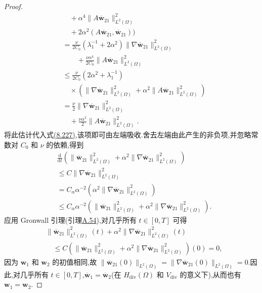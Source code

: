 \begin{theorem}[周期边界情形下解的存在唯一性]
\begin{proof}
\[\begin{aligned}
   &\quad+\alpha^4\|A\overline{\bm{w}}_{21}\|_{L^2(\Omega)}^2\\
   &\quad+2\alpha^2(A\overline{\bm{w}}_{21},
                 \overline{\bm{w}}_{21})\Bigr)\\
 &=\frac{\nu}{2C_0}(\lambda_1^{-1}+2\alpha^2)
       \|\nabla\overline{\bm{w}}_{21}\|_{L^2(\Omega)}^2\\
 &\qquad
   +\frac{\nu\alpha^4}{2C_0}
       \|A\overline{\bm{w}}_{21}\|_{L^2(\Omega)}^2\\
 &\le\frac{\nu}{2C_0}(2\alpha^2+\lambda_1^{-1})\\
 &\quad\times\left(
   \|\nabla\overline{\bm{w}}_{21}\|_{L^2(\Omega)}^2
   +\alpha^2\|A\overline{\bm{w}}_{21}\|_{L^2(\Omega)}^2\right)\\
 &=\frac{\nu}{2}
    \|\nabla\overline{\bm{w}}_{21}\|_{L^2(\Omega)}^2\\
  &\quad+\frac{\nu\alpha^2}{2}
    \|A\overline{\bm{w}}_{21}\|_{L^2(\Omega)}^2.
\end{aligned}
\]
将此估计代入式\hyperref[eq:navier-stokes-alpha-uniqueness-energy-bound]{(8.227)},该项即可由左端吸收.舍去左端由此产生的非负项,并忽略常数对 $C_0$ 和 $\nu$ 的依赖,得到
\[
\begin{aligned}
 &\frac{\mathrm{d}}{\mathrm{d}t}
  \left(\|\overline{\bm{w}}_{21}\|_{L^2(\Omega)}^2
       +\alpha^2\|\nabla\overline{\bm{w}}_{21}\|_{L^2(\Omega)}^2\right)\\
 &\le C\|\nabla\overline{\bm{w}}_{21}\|_{L^2(\Omega)}^2\\
 &=C_\alpha\alpha^{-2}\left(
       \alpha^2\|\nabla\overline{\bm{w}}_{21}\|_{L^2(\Omega)}^2\right)\\
 &\le C_\alpha\alpha^{-2}
  \left(\|\overline{\bm{w}}_{21}\|_{L^2(\Omega)}^2
       +\alpha^2\|\nabla\overline{\bm{w}}_{21}\|_{L^2(\Omega)}^2\right).
\end{aligned}
\]
应用 Gronwall 引理(引理\hyperref[lem:appendix-a-54]{A.54}),对几乎所有 $t\in[0,T]$ 可得
\[
\begin{aligned}
 &\|\overline{\bm{w}}_{21}\|_{L^2(\Omega)}^2(t)
  +\alpha^2\|\nabla\overline{\bm{w}}_{21}\|_{L^2(\Omega)}^2(t)\\
 &\quad\le C\left(
  \|\overline{\bm{w}}_{21}\|_{L^2(\Omega)}^2
  +\alpha^2\|\nabla\overline{\bm{w}}_{21}\|_{L^2(\Omega)}^2\right)(0)=0,
\end{aligned}
\]
因为 $\bm{w}_1$ 和 $\bm{w}_2$ 的初值相同,故
$\|\overline{\bm{w}}_{21}(0)\|_{L^2(\Omega)}
=\|\nabla\overline{\bm{w}}_{21}(0)\|_{L^2(\Omega)}=0$.因此,对几乎所有 $t\in[0,T]$,$\overline{\bm{w}}_1=\overline{\bm{w}}_2$(在 $H_{\mathrm{div}}(\Omega)$ 和 $V_{\mathrm{div}}$ 的意义下),从而也有 $\bm{w}_1=\bm{w}_2$.
\end{proof}
\end{theorem}

